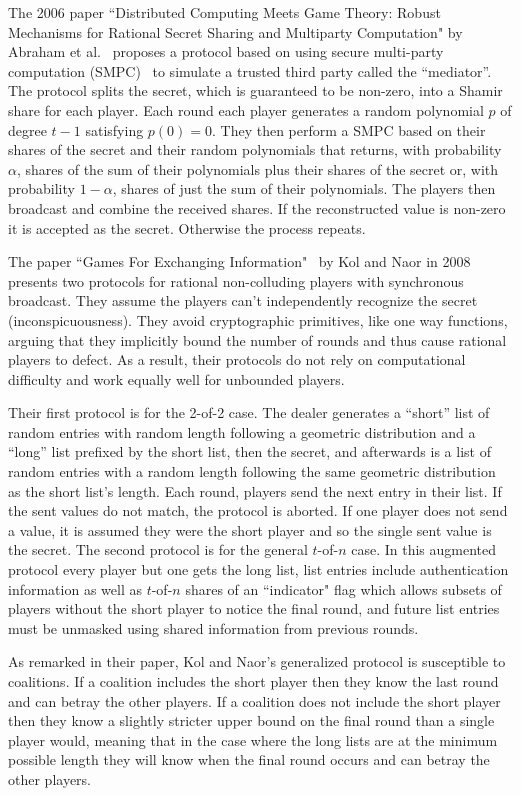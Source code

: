 \documentclass[12pt]{dalcsthesis}
\begin{document}
The 2006 paper ``Distributed Computing Meets Game Theory: Robust Mechanisms for Rational Secret Sharing and Multiparty Computation" by Abraham et al.~\cite{abraham06} proposes a protocol based on using secure multi-party computation (SMPC)~\cite{Yao82} to simulate a trusted third party called the ``mediator''. The protocol splits the secret, which is guaranteed to be non-zero, into a Shamir share for each player. Each round each player generates a random polynomial $p$ of degree $t-1$ satisfying $p(0) = 0$. They then perform a SMPC based on their shares of the secret and their random polynomials that returns, with probability $\alpha$, shares of the sum of their polynomials plus their shares of the secret or, with probability $1-\alpha$, shares of just the sum of their polynomials. The players then broadcast and combine the received shares. If the reconstructed value is non-zero it is accepted as the secret. Otherwise the process repeats.

The paper ``Games For Exchanging Information"~\cite{kol08} by Kol and Naor in 2008 presents two protocols for rational non-colluding players with synchronous broadcast. They assume the players can't independently recognize the secret (inconspicuousness). They avoid cryptographic primitives, like one way functions, arguing that they implicitly bound the number of rounds and thus cause rational players to defect. As a result, their protocols do not rely on computational difficulty and work equally well for unbounded players.

Their first protocol is for the 2-of-2 case. The dealer generates a ``short'' list of random entries with random length following a geometric distribution and a ``long'' list prefixed by the short list, then the secret, and afterwards is a list of random entries with a random length following the same geometric distribution as the short list's length. Each round, players send the next entry in their list. If the sent values do not match, the protocol is aborted. If one player does not send a value, it is assumed they were the short player and so the single sent value is the secret. The second protocol is for the general $t$-of-$n$ case. In this augmented protocol every player but one gets the long list, list entries include authentication information as well as $t$-of-$n$ shares of an ``indicator" flag which allows subsets of players without the short player to notice the final round, and future list entries must be unmasked using shared information from previous rounds.

As remarked in their paper, Kol and Naor's generalized protocol is susceptible to coalitions. If a coalition includes the short player then they know the last round and can betray the other players. If a coalition does not include the short player then they know a slightly stricter upper bound on the final round than a single player would, meaning that in the case where the long lists are at the minimum possible length they will know when the final round occurs and can betray the other players.
\end{document}
